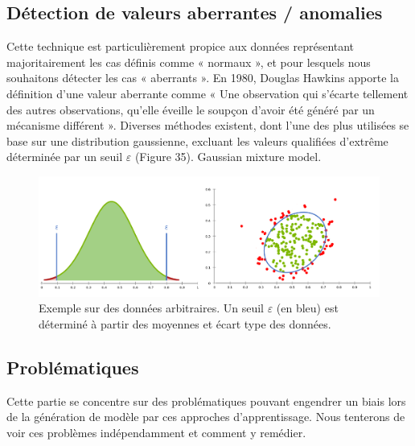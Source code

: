 \subsection{Détection de valeurs aberrantes / anomalies}
Cette technique est particulièrement propice aux données représentant majoritairement les cas définis comme « normaux », et pour lesquels nous souhaitons détecter les cas « aberrants ». En 1980, Douglas Hawkins apporte la définition d’une valeur aberrante comme « Une observation qui s’écarte tellement des autres observations, qu’elle éveille le soupçon d’avoir été généré par un mécanisme différent ». Diverses méthodes existent, dont l’une des plus utilisées se base sur une distribution gaussienne, excluant les valeurs qualifiées d’extrême déterminée par un seuil $\varepsilon$ (Figure 35). Gaussian mixture model.
  
\begin{figure}[H]
    \centering
    \includegraphics[width=\linewidth]{contents/chapter_3/resources/AnomalyDetection.png}
    \caption{Exemple sur des données arbitraires. Un seuil $\varepsilon$ (en bleu) est déterminé à partir des moyennes et écart type des données.}
    \label{fig:anomaly}
\end{figure}

\subsection{Problématiques}
Cette partie se concentre sur des problématiques pouvant engendrer un biais lors de la génération de modèle par ces approches d’apprentissage. Nous tenterons de voir ces problèmes indépendamment et comment y remédier.

